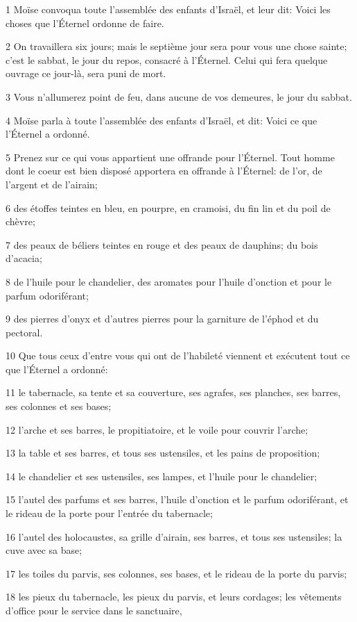 \par 1 Moïse convoqua toute l'assemblée des enfants d'Israël, et leur dit: Voici les choses que l'Éternel ordonne de faire.
\par 2 On travaillera six jours; mais le septième jour sera pour vous une chose sainte; c'est le sabbat, le jour du repos, consacré à l'Éternel. Celui qui fera quelque ouvrage ce jour-là, sera puni de mort.
\par 3 Vous n'allumerez point de feu, dans aucune de vos demeures, le jour du sabbat.
\par 4 Moïse parla à toute l'assemblée des enfants d'Israël, et dit: Voici ce que l'Éternel a ordonné.
\par 5 Prenez sur ce qui vous appartient une offrande pour l'Éternel. Tout homme dont le coeur est bien disposé apportera en offrande à l'Éternel: de l'or, de l'argent et de l'airain;
\par 6 des étoffes teintes en bleu, en pourpre, en cramoisi, du fin lin et du poil de chèvre;
\par 7 des peaux de béliers teintes en rouge et des peaux de dauphins; du bois d'acacia;
\par 8 de l'huile pour le chandelier, des aromates pour l'huile d'onction et pour le parfum odoriférant;
\par 9 des pierres d'onyx et d'autres pierres pour la garniture de l'éphod et du pectoral.
\par 10 Que tous ceux d'entre vous qui ont de l'habileté viennent et exécutent tout ce que l'Éternel a ordonné:
\par 11 le tabernacle, sa tente et sa couverture, ses agrafes, ses planches, ses barres, ses colonnes et ses bases;
\par 12 l'arche et ses barres, le propitiatoire, et le voile pour couvrir l'arche;
\par 13 la table et ses barres, et tous ses ustensiles, et les pains de proposition;
\par 14 le chandelier et ses ustensiles, ses lampes, et l'huile pour le chandelier;
\par 15 l'autel des parfums et ses barres, l'huile d'onction et le parfum odoriférant, et le rideau de la porte pour l'entrée du tabernacle;
\par 16 l'autel des holocaustes, sa grille d'airain, ses barres, et tous ses ustensiles; la cuve avec sa base;
\par 17 les toiles du parvis, ses colonnes, ses bases, et le rideau de la porte du parvis;
\par 18 les pieux du tabernacle, les pieux du parvis, et leurs cordages; les vêtements d'office pour le service dans le sanctuaire,

